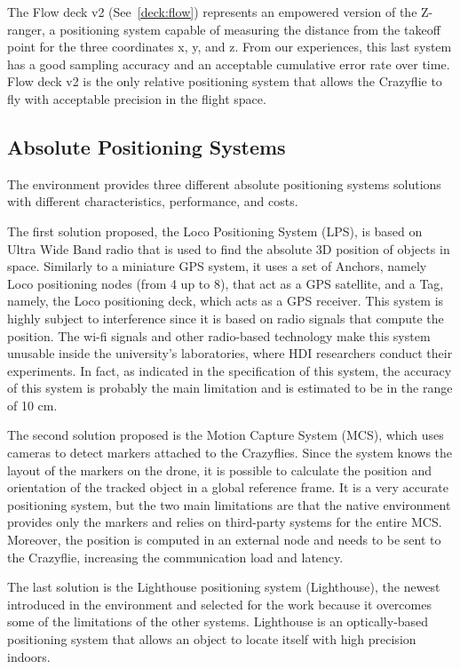 The Flow deck v2 (See~\ref{deck:flow}) represents an empowered version of the Z-ranger, a positioning system capable of measuring the distance from the takeoff point for the three coordinates x, y, and z. 
From our experiences, this last system has a good sampling accuracy and an acceptable cumulative error rate over time. 
Flow deck v2 is the only relative positioning system that allows the Crazyflie to fly with acceptable precision in the flight space.


\subsection{Absolute Positioning Systems}\label{subsec:absolute_positioning_systems}
The environment provides three different absolute positioning systems solutions with different characteristics, performance, and costs. 

The first solution proposed, the Loco Positioning System (LPS), is based on Ultra Wide Band radio that is used to find the absolute 3D position of objects in space. 
Similarly to a miniature GPS system, it uses a set of Anchors, namely Loco positioning nodes (from 4 up to 8), that act as a GPS satellite, and a Tag, 
namely, the Loco positioning deck, which acts as a GPS receiver. 
This system is highly subject to interference since it is based on radio signals that compute the position. 
The wi-fi signals and other radio-based technology make this system unusable inside the university's laboratories, where HDI researchers conduct their experiments.
In fact, as indicated in the specification of this system, the accuracy of this system is probably the main limitation and is estimated to be in the range of 10 cm. 

The second solution proposed is the Motion Capture System (MCS), which uses cameras to detect markers attached to the Crazyflies. 
Since the system knows the layout of the markers on the drone, it is possible to calculate the position and orientation of the tracked object in a global reference frame. 
It is a very accurate positioning system, but the two main limitations are that the native environment provides only the markers and relies on third-party systems for the entire MCS. 
Moreover, the position is computed in an external node and needs to be sent to the Crazyflie, increasing the communication load and latency.

The last solution is the Lighthouse positioning system (Lighthouse), the newest introduced in the environment and selected for the work because it overcomes some of the limitations of the other systems.
Lighthouse is an optically-based positioning system that allows an object to locate itself with high precision indoors. 

